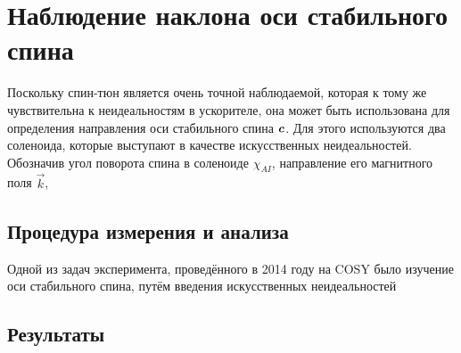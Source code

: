 \section{Наблюдение наклона оси стабильного спина}
Поскольку спин-тюн является очень точной наблюдаемой, которая к тому же чувствительна к неидеальностям
в ускорителе, она может быть использована для определения направления оси стабильного спина $\boldsymbol c$.
Для этого используются два соленоида, которые выступают в качестве искусственных неидеальностей. Обозначив
угол поворота спина в соленоиде $\chi_{AI}$, направление его магнитного поля $\vec k$,


\subsection{Процедура измерения и анализа}
Одной из задач эксперимента, проведённого в 2014 году на COSY было изучение оси стабильного спина, путём
введения искусственных неидеальностей


\subsection{Результаты}
